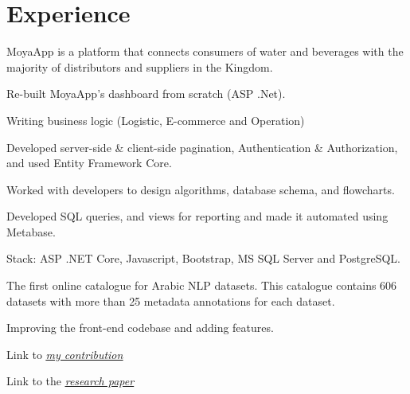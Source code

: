 \documentclass[]{main}
\begin{document}
\begin{minipage}[t]{0.66\textwidth} 


\section{Experience}
\vspace{\topsep}
\begin{tightemize}
\item MoyaApp is a platform that connects consumers of water and beverages with the majority of distributors and suppliers in the Kingdom.
\item Re-built MoyaApp's dashboard from scratch (ASP .Net). 
\item Writing business logic (Logistic, E-commerce and Operation)
\item Developed server-side \& client-side pagination, Authentication \& Authorization, and used Entity Framework Core.
\item Worked with developers to design algorithms, database schema, and flowcharts.
\item Developed SQL queries, and views for reporting and made it automated using Metabase.
\item Stack: ASP .NET Core, Javascript, Bootstrap, MS SQL Server and PostgreSQL.
\end{tightemize}
\sectionsep


\begin{tightemize}
\item The first online catalogue for Arabic NLP datasets. This catalogue contains 606 datasets with more than 25 metadata annotations for each dataset.
\item Improving the front-end codebase and adding features. 
\item Link to \href{https://github.com/ARBML/masader/pull/89}{\underline{\emph{my contribution}}}
\item Link to the \href{https://arxiv.org/pdf/2208.00932.pdf}{\underline{\emph{research paper}}}

\end{tightemize}
\sectionsep



\end{minipage}
\end{document}
